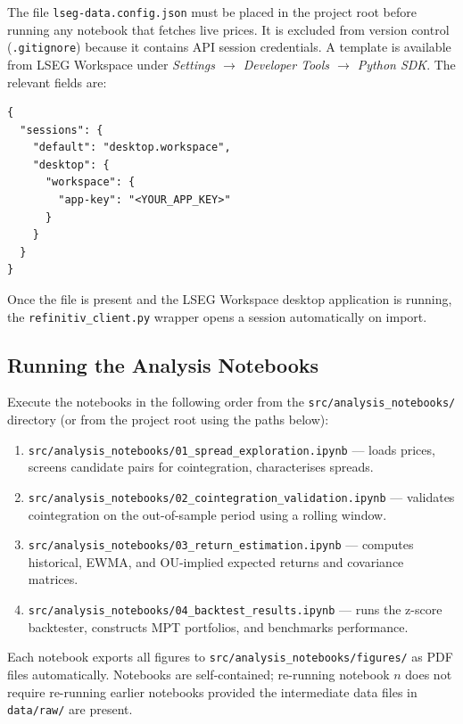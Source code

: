\documentclass[a4paper]{report}
\begin{document}
The file \texttt{lseg-data.config.json} must be placed in the project root before running any notebook that fetches live prices.  It is excluded from version control (\texttt{.gitignore}) because it contains API session credentials.  A template is available from LSEG Workspace under \emph{Settings $\rightarrow$ Developer Tools $\rightarrow$ Python SDK}.  The relevant fields are:

\begin{Verbatim}[fontsize=\small, baselinestretch=0.9]
{
  "sessions": {
    "default": "desktop.workspace",
    "desktop": {
      "workspace": {
        "app-key": "<YOUR_APP_KEY>"
      }
    }
  }
}
\end{Verbatim}

Once the file is present and the LSEG Workspace desktop application is running, the \texttt{refinitiv\_client.py} wrapper opens a session automatically on import.

\subsection{Running the Analysis Notebooks}

Execute the notebooks in the following order from the \texttt{src/analysis\_notebooks/} directory (or from the project root using the paths below):

\begin{enumerate}
    \item \texttt{src/analysis\_notebooks/01\_spread\_exploration.ipynb} --- loads prices, screens candidate pairs for cointegration, characterises spreads.
    \item \texttt{src/analysis\_notebooks/02\_cointegration\_validation.ipynb} --- validates cointegration on the out-of-sample period using a rolling window.
    \item \texttt{src/analysis\_notebooks/03\_return\_estimation.ipynb} --- computes historical, EWMA, and OU-implied expected returns and covariance matrices.
    \item \texttt{src/analysis\_notebooks/04\_backtest\_results.ipynb} --- runs the z-score backtester, constructs MPT portfolios, and benchmarks performance.
\end{enumerate}

Each notebook exports all figures to \texttt{src/analysis\_notebooks/figures/} as PDF files automatically.  Notebooks are self-contained; re-running notebook $n$ does not require re-running earlier notebooks provided the intermediate data files in \texttt{data/raw/} are present.
\end{document}
